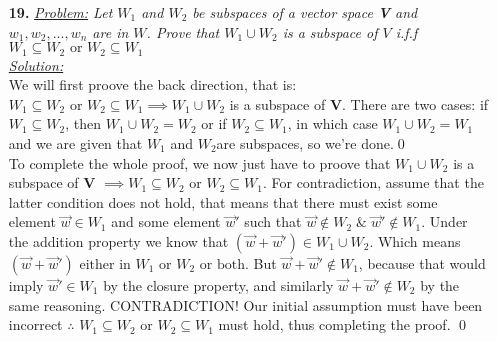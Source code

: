 \documentclass[11pt, fleqn]{article}
\begin{document}
\begin{itemize}
    \item [\textbf{19.}]\textit{\underline{Problem:} Let $W_1$ and $W_2$ be subspaces of a vector space \textbf{V} and $w_1, w_2, ... , w_n$ are in $W$. Prove that $W_1 \cup W_2$ is a subspace of $V$ i.f.f $W_1 \subseteq W_2 \text{ or } W_2 \subseteq W_1$ }\\[2ex]\textit{\underline{Solution:}}\\
    	We will first proove the back direction, that is: $W_1 \subseteq W_2 \text{ or } W_2 \subseteq W_1 \implies W_1 \cup W_2$ is a subspace of \textbf{V}. There are two cases: if $W_1 \subseteq W_2$, then $W_1 \cup W_2 = W_2$  or if $W_2 \subseteq W_1$, in which case $W_1 \cup W_2 = W_1$ and we are given that $W_1$ and $W_2 $are subspaces, so we're done.\qed\\[2ex]
    	\hspace*{20pt}To complete the whole proof, we now just have to proove that $W_1 \cup W_2$ is a subspace of \textbf{V} $\implies W_1 \subseteq W_2 \text{ or } W_2 \subseteq W_1$. For contradiction, assume that the latter condition does not hold, that means that there must exist some element $\vec w \in W_1$ and some element $\vec w\prime$ such that $\vec w \notin W_2 \;\&\; \vec w\prime \notin W_1$. Under the addition property we know that $(\vec w + \vec w\prime) \in W_1 \cup W_2$. Which means $(\vec w + \vec w\prime) \text{ either in } W_1 \text{ or } W_2 \text{ or both}$. But $\vec w + \vec w\prime \notin W_1$, because that would imply $\vec w\prime \in W_1$ by the closure property, and similarly $\vec w + \vec w\prime \notin W_2$ by the same reasoning. CONTRADICTION! Our initial assumption must have been incorrect $\therefore$\; $W_1 \subseteq W_2 \text{ or } W_2 \subseteq W_1$ must hold, thus completing the proof. \qed



\end{itemize}
\end{document}
